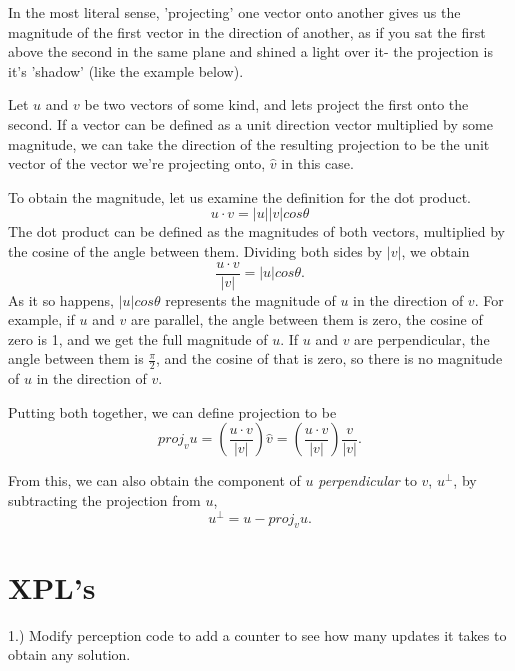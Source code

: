 In the most literal sense, 'projecting' one vector onto another gives us the magnitude of the first vector in the direction of another, as if you sat the first above the second in the same plane and shined a light over it- the projection is it's 'shadow' (like the example below).


Let $u$ and $v$ be two vectors of some kind, and lets project the first onto the second. If a vector can be defined as a unit direction vector multiplied by some magnitude, we can take the direction of the resulting projection to be the unit vector of the vector we're projecting onto, $\hat{v}$ in this case.

To obtain the magnitude, let us examine the definition for the dot product.
\[
    u \cdot v = |u||v|cos\theta
\]
The dot product can be defined as the magnitudes of both vectors, multiplied by the cosine of the angle between them. Dividing both sides by $|v|$, we obtain
\[
    \frac{u \cdot v}{|v|} = |u|cos\theta.
\]
As it so happens, $|u|cos\theta$ represents the magnitude of $u$ in the direction of $v$. For example, if $u$ and $v$ are parallel, the angle between them is zero, the cosine of zero is 1, and we get the full magnitude of $u$. If $u$ and $v$ are perpendicular, the angle between them is $\frac{\pi}{2}$, and the cosine of that is zero, so there is no magnitude of $u$ in the direction of $v$.

Putting both together, we can define projection to be
\[
    proj_vu = (\frac{u \cdot v}{|v|})\hat{v} = (\frac{u \cdot v}{|v|})\frac{v}{|v|}.
\]

From this, we can also obtain the component of $u$ \textit{perpendicular} to $v$, $u^\perp$, by subtracting the projection from $u$,
\[
    u^\perp = u - proj_vu.
\]

\section{XPL's}
1.) Modify perception code to add a counter to see how many updates it takes to obtain any solution.











